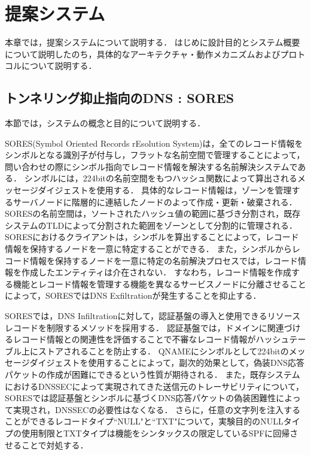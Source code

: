 \section{提案システム}
本章では，提案システムについて説明する．
はじめに設計目的とシステム概要について説明したのち，具体的なアーキテクチャ・動作メカニズムおよびプロトコルについて説明する．

\subsection{トンネリング抑止指向のDNS : SORES}
本節では，システムの概念と目的について説明する．

SORES(Symbol Oriented Records rEsolution System)は，全てのレコード情報をシンボルとなる識別子が付与し，フラットな名前空間で管理することによって，問い合わせの際にシンボル指向でレコード情報を解決する名前解決システムである．
シンボルには，224bitの名前空間をもつハッシュ関数によって算出されるメッセージダイジェストを使用する．
具体的なレコード情報は，ゾーンを管理するサーバノードに階層的に連結したノードのよって作成・更新・破棄される．
SORESの名前空間は，ソートされたハッシュ値の範囲に基づき分割され，既存システムのTLDによって分割された範囲をゾーンとして分割的に管理される．
SORESにおけるクライアントは，シンボルを算出することによって，レコード情報を保持するノードを一意に特定することができる．
また，シンボルからレコード情報を保持するノードを一意に特定の名前解決プロセスでは，レコード情報を作成したエンティティは介在されない．
すなわち，レコード情報を作成する機能とレコード情報を管理する機能を異なるサービスノードに分離させることによって，SORESではDNS Exfiltrationが発生することを抑止する．

SORESでは，DNS Infiltrationに対して，認証基盤の導入と使用できるリソースレコードを制限するメソッドを採用する．
認証基盤では，ドメインに関連づけるレコード情報との関連性を評価することで不審なレコード情報がハッシュテーブル上にストアされることを防止する．
QNAMEにシンボルとして224bitのメッセージダイジェストを使用することによって，副次的効果として，偽装DNS応答パケットの作成が困難にできるという性質が期待される．
また，既存システムにおけるDNSSECによって実現されてきた送信元のトレーサビリティについて，SORESでは認証基盤とシンボルに基づくDNS応答パケットの偽装困難性によって実現され，DNSSECの必要性はなくなる．
さらに，任意の文字列を注入することができるレコードタイプ``NULL"と``TXT"について，実験目的のNULLタイプの使用制限とTXTタイプは機能をシンタックスの限定しているSPFに回帰させることで対処する．

